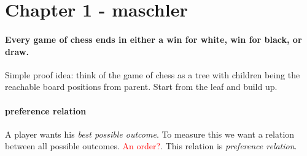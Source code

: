 \section{Chapter 1 - maschler}
\paragraph{Every game of chess ends in either a win for white, win for black, or draw.}
Simple proof idea: think of the game of chess as a tree with children being the reachable board positions from parent. Start from the leaf and build up.

\paragraph{preference relation} A player wants his \textit{best possible outcome}. To measure this we want a relation between all possible outcomes. \textcolor{red}{An order?}. This relation is \textit{preference relation}.